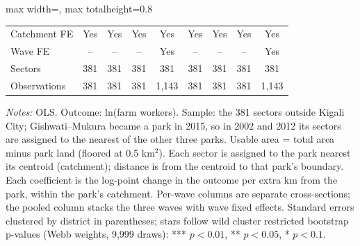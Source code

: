 \documentclass[11pt]{article}
\begin{document}
\begin{table}[H]
\begin{adjustbox}{max width=\textwidth, max totalheight=0.8\textheight}
\begin{tabular}{lcccccccc}
Catchment FE & Yes & Yes & Yes & Yes & Yes & Yes & Yes & Yes \\
Wave FE & -- & -- & -- & Yes & -- & -- & -- & Yes \\
Sectors & 381 & 381 & 381 & 381 & 381 & 381 & 381 & 381 \\
Observations & 381 & 381 & 381 & 1,143 & 381 & 381 & 381 & 1,143 \\
\bottomrule
\end{tabular}
\end{adjustbox}
\begin{minipage}{0.97\textwidth}\scriptsize
\textit{Notes:} OLS. Outcome: ln(farm workers). Sample: the 381 sectors outside Kigali City; Gishwati--Mukura became a park in 2015, so in 2002 and 2012 its sectors are assigned to the nearest of the other three parks. Usable area = total area minus park land (floored at 0.5 km$^2$). Each sector is assigned to the park nearest its centroid (catchment); distance is from the centroid to that park's boundary. Each coefficient is the log-point change in the outcome per extra km from the park, within the park's catchment. Per-wave columns are separate cross-sections; the pooled column stacks the three waves with wave fixed effects. Standard errors clustered by district in parentheses; stars follow wild cluster restricted bootstrap p-values (Webb weights, 9,999 draws): *** $p<0.01$, ** $p<0.05$, * $p<0.1$.
\end{minipage}
\end{table}
\clearpage
\end{document}
